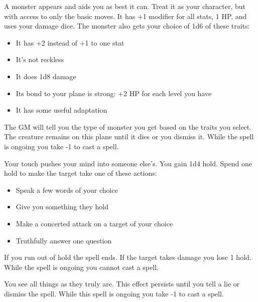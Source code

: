 \newpage



 A monster appears and aids you as best it can. Treat it as your character, but with access to only the basic moves. It has +1 modifier for all stats, 1 HP, and uses your damage dice. The monster also gets your choice of 1d6 of these traits: 
\begin{itemize}
\item It has +2 instead of +1 to one stat
\item It's not reckless
\item It does 1d8 damage
\item Its bond to your plane is strong: +2 HP for each level you have
\item It has some useful adaptation

\end{itemize}


 The GM will tell you the type of monster you get based on the traits you select. The creature remains on this plane until it dies or you dismiss it. While the spell is ongoing you take -1 to cast a spell.





 Your touch pushes your mind into someone else's. You gain 1d4 hold. Spend one hold to make the target take one of these actions:
\begin{itemize}
\item Speak a few words of your choice
\item Give you something they hold
\item Make a concerted attack on a target of your choice
\item Truthfully answer one question

\end{itemize}


 If you run out of hold the spell ends. If the target takes damage you lose 1 hold. While the spell is ongoing you cannot cast a spell.





 You see all things as they truly are. This effect persists until you tell a lie or dismiss the spell. While this spell is ongoing you take -1 to cast a spell.

\newpage



